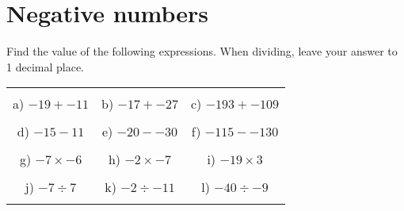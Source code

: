 \documentclass[12pt]{article}
\begin{document}
\pagestyle{fancy}
\fancyfoot{} 
\section{Negative numbers}
Find the value of the following expressions. When dividing, leave your answer to 1 decimal place.
\begin{table}[h!]
\centering
\begin{tabular}{c c c}
\hspace{5cm} & \hspace{5cm} & \hspace{5cm} \\
a) ${-19} + {-11}$ & b) ${-17} + {-27}$ & c) ${-193} + {-109}$ \\ \\
d) ${-15} - {11}$ & e) ${-20} - {-30}$ & f) ${-115} - {-130}$ \\ \\
g) ${-7}\times{-6}$ & h) ${-2}\times{-7}$ & i) ${-19}\times{3}$ \\ \\
j) ${-7}\div{7}$ & k) ${-2}\div{-11}$ & l) ${-40}\div{-9}$ \\ \\
\end{tabular}
\end{table}
\newline
\end{document}
